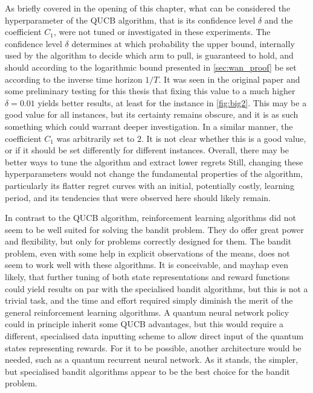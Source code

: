 As briefly covered in the opening of this chapter, what can be considered the hyperparameter of the QUCB algorithm, that is its confidence level $\delta$ and the coefficient $C_1$, were not tuned or investigated in these experiments.
The confidence level $\delta$ determines at which probability the upper bound, internally used by the algorithm to decide which arm to pull, is guaranteed to hold, and should according to the logarithmic bound presented in \cref{sec:wan_proof} be set according to the inverse time horizon $1/T$.
It was seen in the original paper and some preliminary testing for this thesis that fixing this value to a much higher $\delta = 0.01$ yields better results, at least for the instance in \cref{fig:big2}.
This may be a good value for all instances, but its certainty remains obscure, and it is as such something which could warrant deeper investigation.
In a similar manner, the coefficient $C_1$ was arbitrarily set to $2$.
It is not clear whether this is a good value, or if it should be set differently for different instances.
Overall, there may be better ways to tune the algorithm and extract lower regrets
Still, changing these hyperparameters would not change the fundamental properties of the algorithm, particularly its flatter regret curves with an initial, potentially costly, learning period, and its tendencies that were observed here should likely remain.

In contrast to the QUCB algorithm, reinforcement learning algorithms did not seem to be well suited for solving the bandit problem.
They do offer great power and flexibility, but only for problems correctly designed for them.
The bandit problem, even with some help in explicit observations of the means, does not seem to work well with these algorithms.
It is conceivable, and mayhap even likely, that further tuning of both state representations and reward functions could yield results on par with the specialised bandit algorithms, but this is not a trivial task, and the time and effort required simply diminish the merit of the general reinforcement learning algorithms.
A quantum neural network policy could in principle inherit some QUCB advantages, but this would require a different, specialised data inputting scheme to allow direct input of the quantum states representing rewards.
For it to be possible, another architecture would be needed, such as a quantum recurrent neural network.
As it stands, the simpler, but specialised bandit algorithms appear to be the best choice for the bandit problem.
